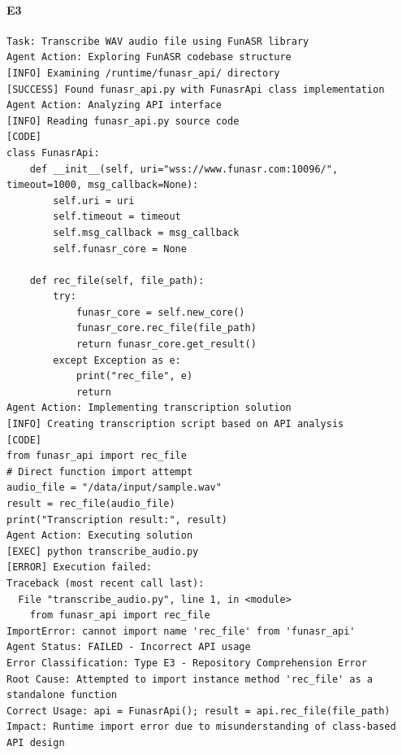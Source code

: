 \paragraph{E3}
\begin{lstlisting}[language={},caption={FunASR audio transcription failed due to incorrect API usage.},label={lst:funasr-execution}]
Task: Transcribe WAV audio file using FunASR library
Agent Action: Exploring FunASR codebase structure
[INFO] Examining /runtime/funasr_api/ directory
[SUCCESS] Found funasr_api.py with FunasrApi class implementation
Agent Action: Analyzing API interface
[INFO] Reading funasr_api.py source code
[CODE] 
class FunasrApi:
    def __init__(self, uri="wss://www.funasr.com:10096/", timeout=1000, msg_callback=None):
        self.uri = uri
        self.timeout = timeout
        self.msg_callback = msg_callback
        self.funasr_core = None
    
    def rec_file(self, file_path):
        try:
            funasr_core = self.new_core()
            funasr_core.rec_file(file_path)
            return funasr_core.get_result()
        except Exception as e:
            print("rec_file", e)
            return
Agent Action: Implementing transcription solution
[INFO] Creating transcription script based on API analysis
[CODE]
from funasr_api import rec_file
# Direct function import attempt
audio_file = "/data/input/sample.wav"
result = rec_file(audio_file)
print("Transcription result:", result)
Agent Action: Executing solution
[EXEC] python transcribe_audio.py
[ERROR] Execution failed:
Traceback (most recent call last):
  File "transcribe_audio.py", line 1, in <module>
    from funasr_api import rec_file
ImportError: cannot import name 'rec_file' from 'funasr_api'
Agent Status: FAILED - Incorrect API usage
Error Classification: Type E3 - Repository Comprehension Error
Root Cause: Attempted to import instance method 'rec_file' as a standalone function
Correct Usage: api = FunasrApi(); result = api.rec_file(file_path)
Impact: Runtime import error due to misunderstanding of class-based API design
\end{lstlisting}

